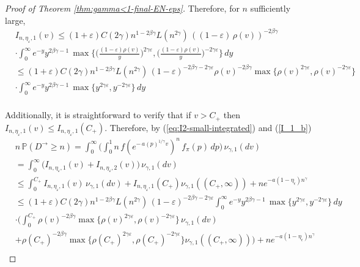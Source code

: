 \documentclass[preprint]{imsart}
\newcommand{\PP}{\mathbb{P}}
\newcommand{\1}{\mathbf{1}}
\theoremstyle{plain}
\theoremstyle{definition}
\begin{document}
\begin{proof}[Proof of Theorem \ref{thm:gamma<1-final-EN-eps}]
Therefore, for \(n\) sufficiently large,
\begin{equation}\label{I_1_b}
    \begin{split}
       &I_{n,\eta_{\varepsilon},1}(v)\le  (1+\varepsilon)C(2\gamma)n^{1-2\beta\gamma}L(n^{2\gamma})\,((1-\varepsilon)\,\rho(v))^{-2\beta\gamma}\\
       &\cdot \int_{0}^{\infty} e^{-y}y^{2\beta\gamma-1}\,\max\Bigg\{\Bigg(\frac{(1-\varepsilon)\rho(v)}{y}\Bigg)^{2\gamma\varepsilon},\Bigg(\frac{(1-\varepsilon)\rho(v)}{y}\Bigg)^{-2\gamma\varepsilon}\Bigg\} \,dy\\
       &\le  (1+\varepsilon)C(2\gamma)n^{1-2\beta\gamma}L(n^{2\gamma})\,(1-\varepsilon)^{-2\beta\gamma-2\gamma\varepsilon}\rho(v)^{-2\beta\gamma}\max\{\rho(v)^{2\gamma\varepsilon},\rho(v)^{-2\gamma\varepsilon}\}\\
       &\cdot \int_{0}^{\infty} e^{-y}y^{2\beta\gamma-1}\,\max\{y^{2\gamma\varepsilon},y^{-2\gamma\varepsilon}\} \,dy\\
    \end{split}
\end{equation}

Additionally, it is straightforward to verify that if \(v>C_{+}\) then \(I_{n,\eta_{\varepsilon},1}(v)\le I_{n,\eta_{\varepsilon},1}(C_{+})\). Therefore, by (\ref{eq:I2-small-integrated}) and (\ref{I_1_b})
\begin{equation}\label{lim_sup_Dn}
    \begin{split}
    &n\,\PP(D^{\rightarrow}\ge n)=\int_0^\infty \Big(\int_0^1 n\,f(e^{-\,a(p)^{1/\gamma}v})^{n}\, f_\pi(p)\,dp\Big)\,\nu_{\gamma,1}(dv)\\
    &=\int_0^\infty \Big(I_{n,\eta_{\varepsilon},1}(v)+I_{n,\eta_{\varepsilon},2}(v)\Big)\,\nu_{\gamma,1}(dv)\\
    &\leq \int_0^{C_{+}} I_{n,\eta_{\varepsilon},1}(v)\,\nu_{\gamma,1}(dv)+I_{n,\eta_{\varepsilon},1}(C_{+})\nu_{\gamma,1}((C_{+},\infty))+ne^{-a(1-\eta_{\epsilon})n^{\gamma}}\\
    &\le  (1+\varepsilon)C(2\gamma)n^{1-2\beta\gamma}L(n^{2\gamma})\,(1-\varepsilon)^{-2\beta\gamma-2\gamma\varepsilon} \int_{0}^{\infty} e^{-y}y^{2\beta\gamma-1}\,\max\{y^{2\gamma\varepsilon},y^{-2\gamma\varepsilon}\} \,dy\\
       &\cdot\Bigg(\int_0^{C_{+}}\rho(v)^{-2\beta\gamma}\max\{\rho(v)^{2\gamma\varepsilon},\rho(v)^{-2\gamma\varepsilon}\}\,\nu_{\gamma,1}(dv)\\
       &+\rho(C_{+})^{-2\beta\gamma}\max\{\rho(C_{+})^{2\gamma\varepsilon},\rho(C_{+})^{-2\gamma\varepsilon}\}\nu_{\gamma,1}((C_{+},\infty))\Bigg)+ne^{-a(1-\eta_{\epsilon})n^{\gamma}}\\
    \end{split}
\end{equation}



\end{proof}
\end{document}
